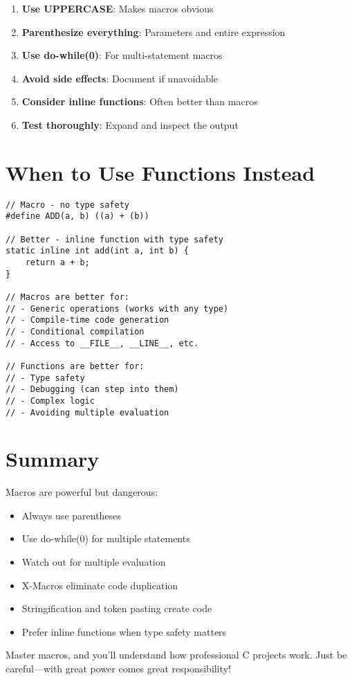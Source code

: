 \begin{enumerate}
    \item \textbf{Use UPPERCASE}: Makes macros obvious
    \item \textbf{Parenthesize everything}: Parameters and entire expression
    \item \textbf{Use do-while(0)}: For multi-statement macros
    \item \textbf{Avoid side effects}: Document if unavoidable
    \item \textbf{Consider inline functions}: Often better than macros
    \item \textbf{Test thoroughly}: Expand and inspect the output
\end{enumerate}

\section{When to Use Functions Instead}

\begin{lstlisting}
// Macro - no type safety
#define ADD(a, b) ((a) + (b))

// Better - inline function with type safety
static inline int add(int a, int b) {
    return a + b;
}

// Macros are better for:
// - Generic operations (works with any type)
// - Compile-time code generation
// - Conditional compilation
// - Access to __FILE__, __LINE__, etc.

// Functions are better for:
// - Type safety
// - Debugging (can step into them)
// - Complex logic
// - Avoiding multiple evaluation
\end{lstlisting}

\section{Summary}

Macros are powerful but dangerous:

\begin{itemize}
    \item Always use parentheses
    \item Use do-while(0) for multiple statements
    \item Watch out for multiple evaluation
    \item X-Macros eliminate code duplication
    \item Stringification and token pasting create code
    \item Prefer inline functions when type safety matters
\end{itemize}

Master macros, and you'll understand how professional C projects work. Just be careful—with great power comes great responsibility!
